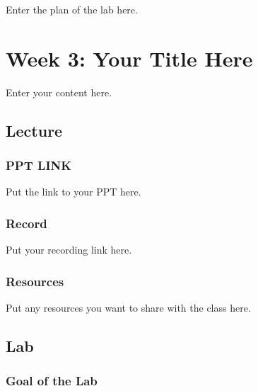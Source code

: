 \documentclass[
  letterpaper,
  oneside]{book}
\numberwithin{equation}{section}
\numberwithin{figure}{section}
\theoremstyle{break}
\begin{document}

Enter the plan of the lab here.

\part{Week 3: Your Title Here}

Enter your content here.

\chapter*{Lecture}\label{lecture-2}


\section*{PPT LINK}\label{ppt-link-2}


Put the link to your PPT here.

\section*{Record}\label{record-2}


Put your recording link here.

\section*{Resources}\label{resources-2}


Put any resources you want to share with the class here.

\chapter*{Lab}\label{lab-2}


\section*{Goal of the Lab}\label{goal-of-the-lab-2}
\end{document}

